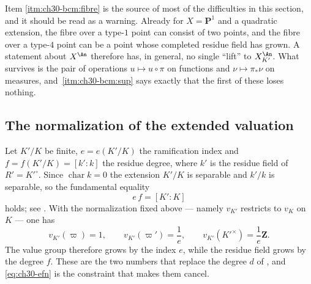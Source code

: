 \begin{remark}
\label{rem:ch30-fibres-not-points}
Item \cref{itm:ch30-bcm:fibre} is the source of most of the difficulties in
this section, and it should be read as a warning.  Already for
\(X=\mathbf P^1\) and a quadratic extension, the fibre over a type-\(1\)
point can consist of two points, and the fibre over a type-\(4\) point can
be a point whose completed residue field has grown.  A statement about
\(X^{\An}\) therefore has, in general, no single ``lift'' to
\(X_{K'}^{\An}\).  What survives is the pair of operations
\(u\mapsto u\circ\pi\) on functions and \(\nu\mapsto\pi_*\nu\) on measures,
and \,\cref{itm:ch30-bcm:sup} says exactly
that the first of these loses nothing.
\end{remark}

\subsection{The normalization of the extended valuation}
\label{sec:ch30-bc-normalization}

Let \(K'/K\) be finite, \(e=e(K'/K)\) the ramification index and
\(f=f(K'/K)=[k':k]\) the residue degree, where \(k'\) is the residue field
of \(R'=K'^\circ\).  Since \(\operatorname{char}k=0\) the extension
\(K'/K\) is separable and \(k'/k\) is separable, so the fundamental equality
\begin{equation}
\label{eq:ch30-efn}
                    e\,f=[K':K]
\end{equation}
holds; see \cite[Ch.~VI]{ZariskiSamuelII}.  With the normalization fixed
above --- namely \(v_{K'}\) restricts to \(v_K\) on \(K\) --- one has
\begin{equation}
\label{eq:ch30-uniformizer-value}
 v_{K'}(\varpi)=1,
 \qquad
 v_{K'}(\varpi')=\frac1e,
 \qquad
 v_{K'}(K'^\times)=\frac1e\mathbf Z .
\end{equation}
The value group therefore grows by the index \(e\), while the residue field
grows by the degree \(f\).  These are the two numbers that replace the
degree \(d\) of , and \eqref{eq:ch30-efn} is the
constraint that makes them cancel.


